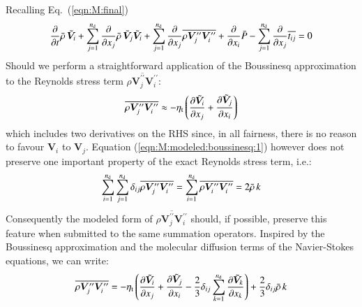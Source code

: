 \documentclass{warpdoc}
\newcommand{\nd}{{{n}_{\rm d}}}
\newcommand{\turb}{_{\rm t}}
\newcommand{\etat}{{\eta\turb}}
\newcommand{\mfd}{\displaystyle}
\begin{document}
Recalling Eq.\ (\ref{eqn:M:final})
%
\begin{equation}
  \mfd\frac{\partial}{\partial t}  \wbar{\rho}\,  {\wtilde{\bm{V}}_i}
      +  \sum_{j=1}^{\nd} \frac{\partial }{\partial x_j}
             \wbar{\rho}\, {\wtilde{\bm{V}}_j} {\wtilde{\bm{V}}_i}
      + \sum_{j=1}^{\nd} \frac{\partial }{\partial x_j}
             \overline{\rho \bm{V}_j^{{\prime\prime}} \bm{V}_i^{{\prime\prime}}}
      +  \frac{\partial }{\partial x_i} \wbar{P}
      -  \sum_{j=1}^{\nd} \frac{\partial }{\partial x_j} \overline{t_{ij}}
      = 0
  \label{eqn:M:modeled:1}
\end{equation}
%
Should we perform a straightforward
application of the Boussinesq approximation to the
Reynolds stress term $\overline{\rho \bm{V}_j^{{\prime\prime}} \bm{V}_i^{{\prime\prime}}}$:
%
\begin{equation}
  \overline{\rho \bm{V}_j^{{\prime\prime}} \bm{V}_i^{{\prime\prime}}}
   \approx 
   -\etat \left(
             \frac{\partial {\wtilde{\bm{V}}_i}}{\partial x_j}
          +\frac{\partial {\wtilde{\bm{V}}_j}}{\partial x_i}
       \right)
  \label{eqn:M:modeled:boussinesq:1}
\end{equation}
%
which includes two derivatives on the RHS  since, in all fairness,
there is no reason to favour $\bm{V}_i$ to $\bm{V}_j$. Equation
(\ref{eqn:M:modeled:boussinesq:1}) however does not preserve one important
property of the exact Reynolds stress term, i.e.:
%
\begin{equation}
    \sum_{i=1}^{\nd} \sum_{j=1}^{\nd} \delta_{ij} \overline{\rho \bm{V}_j^{{\prime\prime}} \bm{V}_i^{{\prime\prime}}}
 =  \sum_{i=1}^{\nd}  \overline{\rho \bm{V}_i^{{\prime\prime}} \bm{V}_i^{{\prime\prime}}}
 =  2 \wbar{\rho}\, k
  \label{eqn:M:modeled:boussinesq:2}
\end{equation}
%
Consequently the modeled form of $\overline{\rho \bm{V}_j^{{\prime\prime}} \bm{V}_i^{{\prime\prime}}}$
should, if possible, preserve this feature when submitted to the same summation
operators.
Inspired by the Boussinesq approximation and the molecular diffusion terms
of the Navier-Stokes equations, we can write:
%
\begin{equation}
  \overline{\rho \bm{V}_j^{{\prime\prime}} \bm{V}_i^{{\prime\prime}}}
   = 
   -\etat \left(
             \frac{\partial {\wtilde{\bm{V}}_i}}{\partial x_j}
          +\frac{\partial {\wtilde{\bm{V}}_j}}{\partial x_i}
          -\frac{2}{3} \delta_{ij} \sum_{k=1}^\nd \frac{\partial {\wtilde{\bm{V}}_k}}{\partial x_k}
       \right)
   + \frac{2}{3} \delta_{ij} \wbar{\rho}\, k
  \label{eqn:M:modeled:boussinesq:3}
\end{equation}
\end{document}
